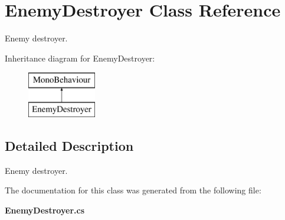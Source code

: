 \section{Enemy\+Destroyer Class Reference}
\label{class_enemy_destroyer}


Enemy destroyer.  


Inheritance diagram for Enemy\+Destroyer\+:\begin{figure}[H]
\begin{center}
\leavevmode
\includegraphics[height=2.000000cm]{class_enemy_destroyer}
\end{center}
\end{figure}


\subsection{Detailed Description}
Enemy destroyer. 



The documentation for this class was generated from the following file\+:\begin{DoxyCompactItemize}
\item 
{\bf Enemy\+Destroyer.\+cs}\end{DoxyCompactItemize}
